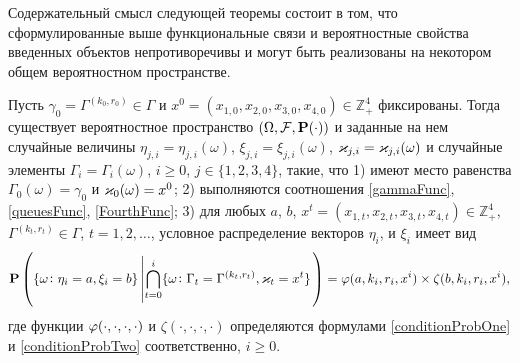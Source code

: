 \documentclass[a4paper,12pt,russian]{extarticle}
\newcommand{\G}{\Gamma}
\newcommand{\ga}[1]{\Gamma^{\left( #1 \right)} }
\renewcommand{\Pr}{{\mathbf P}}
\begin{document}
Содержательный смысл следующей теоремы состоит в том, что сформулированные выше функциональные связи и вероятностные свойства введенных объектов непротиворечивы и могут быть реализованы на некотором общем вероятностном пространстве.
\begin{theorem}
Пусть $\gamma_0=\ga{k_0,r_0} \in \G$ и $x^0=(x_{1,0},x_{2,0}, x_{3,0},x_{4,0})\in \mathbb{Z}_+^4$ фиксированы.
Тогда существует вероятностное пространство $(\Omega, {\cal F}, \Pr(\cdot))$ и заданные на нем случайные величины $\eta_{j,i}=\eta_{j,i}(\omega)$, $\xi_{j,i}=\xi_{j,i}(\omega)$, 	 $\varkappa_{j,i}=\varkappa_{j,i}(\omega)$ и случайные элементы $\G_i=\G_i(\omega)$, $i\geqslant 0$, $j\in \{1, 2, 3, 4\}$, такие, что 1) имеют место равенства $\G_0(\omega) = \gamma_0$ и $\varkappa_0(\omega)=x^0$; 2) выполняются соотношения \eqref{gammaFunc}, \eqref{queuesFunc}, \eqref{FourthFunc}; 3) для любых  $a$, $b$, $x^t=(x_{1,t},x_{2,t},x_{3,t},x_{4,t}) \in \mathbb{Z}_+^4$, $\ga{k_t,r_t} \in \G$, $t = 1, 2, \ldots$, условное распределение векторов $\eta_i$, и $\xi_i$ имеет вид
\begin{equation}
\Pr \left(\{ \omega \colon \eta_i = a, \xi_i=b\} \left|\bigcap_{t=0}^{i}\{\omega\colon \G_t=\ga{k_t,r_t}, \vk_t=x^t\}\right.\right)=
\vp(a,k_i,r_i,x^i)\times \zeta(b,k_i,r_i,x^i),
\label{ProbablititiesToProve}
\end{equation}
где функции $\varphi(\cdot, \cdot, \cdot, \cdot)$ и $\zeta(\cdot, \cdot, \cdot, \cdot)$ определяются формулами \eqref{conditionProbOne} и \eqref{conditionProbTwo} соответственно, $i \geqslant 0$.

\label{myTheorem}
\end{theorem}
\end{document}
